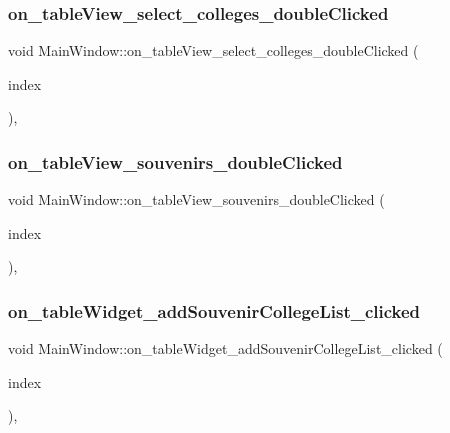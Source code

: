 \subsubsection{\texorpdfstring{on\+\_\+table\+View\+\_\+select\+\_\+colleges\+\_\+double\+Clicked}{on\_tableView\_select\_colleges\_doubleClicked}}
{\footnotesize\ttfamily void Main\+Window\+::on\+\_\+table\+View\+\_\+select\+\_\+colleges\+\_\+double\+Clicked (\begin{DoxyParamCaption}\item[{const Q\+Model\+Index \&}]{index }\end{DoxyParamCaption})\hspace{0.3cm}{\ttfamily [private]}, {\ttfamily [slot]}}

\mbox{\label{class_main_window_a234b2a619a1a3ff0be848b77bd7cc492}} 
\subsubsection{\texorpdfstring{on\+\_\+table\+View\+\_\+souvenirs\+\_\+double\+Clicked}{on\_tableView\_souvenirs\_doubleClicked}}
{\footnotesize\ttfamily void Main\+Window\+::on\+\_\+table\+View\+\_\+souvenirs\+\_\+double\+Clicked (\begin{DoxyParamCaption}\item[{const Q\+Model\+Index \&}]{index }\end{DoxyParamCaption})\hspace{0.3cm}{\ttfamily [private]}, {\ttfamily [slot]}}

\mbox{\label{class_main_window_aebea17f2f77e71cfca0cbbfbfe2223e0}} 
\subsubsection{\texorpdfstring{on\+\_\+table\+Widget\+\_\+add\+Souvenir\+College\+List\+\_\+clicked}{on\_tableWidget\_addSouvenirCollegeList\_clicked}}
{\footnotesize\ttfamily void Main\+Window\+::on\+\_\+table\+Widget\+\_\+add\+Souvenir\+College\+List\+\_\+clicked (\begin{DoxyParamCaption}\item[{const Q\+Model\+Index \&}]{index }\end{DoxyParamCaption})\hspace{0.3cm}{\ttfamily [private]}, {\ttfamily [slot]}}

